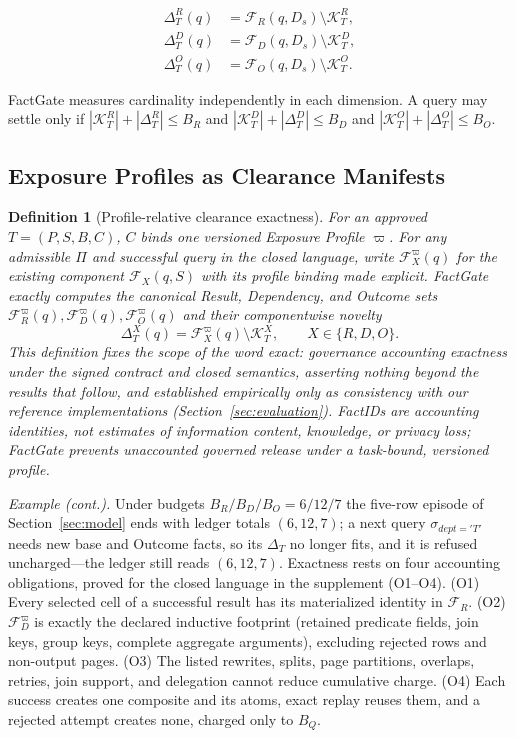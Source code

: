 \documentclass[10pt,journal,compsoc]{IEEEtran}
\newcommand{\system}{FactGate\xspace}
\newcommand{\facts}{\mathcal{F}}
\newcommand{\accounted}{\mathcal{K}}
\newtheorem{definition}{Definition}
\begin{document}
\begin{align}
 \Delta_T^R(q) &= \facts_R(q,D_s)\setminus\accounted_T^R,\\
 \Delta_T^D(q) &= \facts_D(q,D_s)\setminus\accounted_T^D,\\
 \Delta_T^O(q) &= \facts_O(q,D_s)\setminus\accounted_T^O.
 \label{eq:delta}
\end{align}

\system measures cardinality independently in each dimension. A query may settle
only if
$|\accounted_T^R|+|\Delta_T^R|\leq B_R$ and
$|\accounted_T^D|+|\Delta_T^D|\leq B_D$ and
$|\accounted_T^O|+|\Delta_T^O|\leq B_O$.

\subsection{Exposure Profiles as Clearance Manifests}
\label{sec:clearance-profile}

\begin{definition}[Profile-relative clearance exactness]
\label{def:profile-relative-exactness}
For an approved $T=(P,S,B,C)$, $C$ binds one versioned Exposure Profile $\varpi$.
For any admissible $\Pi$ and successful query in the closed language, write
$\facts_X^\varpi(q)$ for the existing component $\facts_X(q,S)$ with its profile
binding made explicit. \system exactly computes the canonical Result, Dependency,
and Outcome sets $\facts_R^\varpi(q),\facts_D^\varpi(q),\facts_O^\varpi(q)$ and their
componentwise novelty
\[
 \Delta_T^X(q)=\facts_X^\varpi(q)\setminus\accounted_T^X,
 \qquad X\in\{R,D,O\}.
\]
This definition fixes the scope of the word \emph{exact}: governance
accounting exactness under the signed contract and closed semantics,
asserting nothing beyond the results that follow, and established
empirically only as consistency with our reference implementations
(Section~\ref{sec:evaluation}). FactIDs are accounting identities, not
estimates of information content, knowledge, or privacy loss; \system prevents
unaccounted governed release under a task-bound, versioned profile.
\end{definition}
\emph{Example (cont.).} Under budgets $B_R/B_D/B_O=6/12/7$ the five-row
episode of Section~\ref{sec:model} ends with ledger totals $(6,12,7)$; a
next query $\sigma_{dept='T'}$ needs new base and Outcome facts, so its
$\Delta_T$ no longer fits, and it is refused uncharged---the ledger still
reads $(6,12,7)$.
Exactness rests on four accounting obligations, proved for the closed
language in the supplement (O1--O4). (O1) Every selected cell of a successful result
has its materialized identity in $\facts_R$. (O2) $\facts_D^\varpi$ is exactly
the declared inductive footprint (retained predicate fields, join keys, group
keys, complete aggregate arguments), excluding rejected rows and non-output
pages. (O3) The listed rewrites, splits, page partitions, overlaps,
retries, join support, and delegation cannot reduce cumulative charge.
(O4) Each success creates one composite and its atoms, exact replay reuses
them, and a rejected attempt creates none, charged only to $B_Q$.
\end{document}
